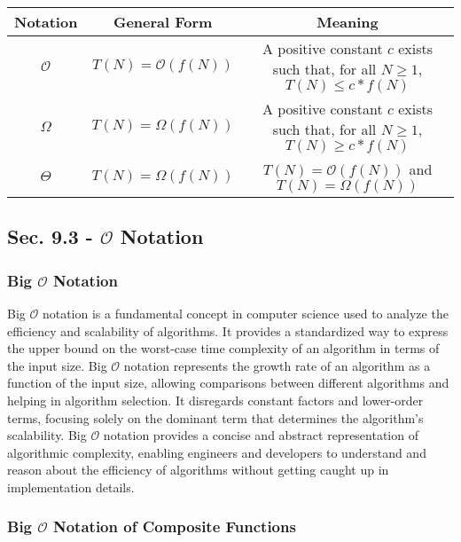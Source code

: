 \begin{center}
    \begin{tabular}{|c|c|c|}
        \hline Notation & General Form & Meaning \\ \hline
        $\mathcal{O}$ & $T(N)=\mathcal{O}(f(N))$ & A positive constant $c$ exists such that, for all $N \geq 1$, $T(N) \leq c * f(N)$ \\ \hline
        $\Omega$ & $T(N)=\Omega(f(N))$ & A positive constant $c$ exists such that, for all $N \geq 1$, $T(N) \geq c * f(N)$ \\ \hline
        $\Theta$ & $T(N)=\Omega(f(N))$ & $T(N)=\mathcal{O}(f(N))$ and $T(N)=\Omega(f(N))$ \\ \hline
    \end{tabular}
\end{center}

\subsection*{Sec. 9.3 - $\mathcal{O}$ Notation}

\subsubsection{Big $\mathcal{O}$ Notation}

Big $\mathcal{O}$ notation is a fundamental concept in computer science used to analyze the efficiency and scalability of algorithms. It provides a standardized way to express the upper bound on the worst-case time complexity of an algorithm in terms of the input size. Big $\mathcal{O}$ notation represents the growth rate of an algorithm as a function of the input size, allowing comparisons between different algorithms 
and helping in algorithm selection. It disregards constant factors and lower-order terms, focusing solely on the dominant term that determines the algorithm's scalability. Big $\mathcal{O}$ notation provides a concise and abstract representation of algorithmic complexity, enabling engineers and developers to understand and reason about the efficiency of algorithms without getting caught up in implementation details.

\subsubsection{Big $\mathcal{O}$ Notation of Composite Functions}

